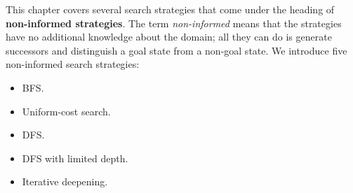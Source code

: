 This chapter covers several search strategies that come under the heading of \textbf{non-informed strategies}. The term \textit{non-informed} means that the strategies have no 
additional knowledge about the domain; all they can do is generate successors and distinguish a goal state from a non-goal state. We introduce five non-informed search strategies:
\begin{itemize}
    \renewcommand{\labelitemi}{-}
    \item BFS.
    \item Uniform-cost search.
    \item DFS.
    \item DFS with limited depth.
    \item Iterative deepening.
\end{itemize}